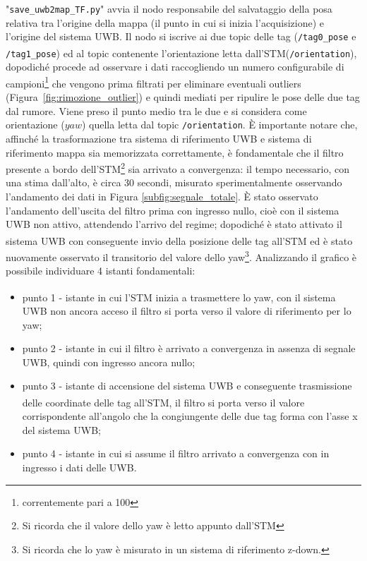 "\verb!save_uwb2map_TF.py!" avvia il nodo responsabile del salvataggio della posa relativa tra l'origine della mappa (il punto in cui si inizia l'acquisizione) e l'origine del sistema UWB. Il nodo si iscrive ai due topic delle tag (\verb!/tag0_pose! e \verb!/tag1_pose!) ed al topic contenente l'orientazione letta dall'STM\textsuperscript\textregistered\hspace{1mm}(\verb!/orientation!), dopodiché procede ad osservare i dati raccogliendo un numero configurabile di campioni\footnote{correntemente pari a 100} che vengono prima filtrati per eliminare eventuali outliers (Figura~\ref{fig:rimozione_outlier}) e quindi mediati per ripulire le pose delle due tag dal rumore. Viene preso il punto medio tra le due e si considera come orientazione ($yaw$) quella letta dal topic \verb!/orientation!.
È importante notare che, affinché la trasformazione tra sistema di riferimento UWB e sistema di riferimento mappa sia memorizzata correttamente, è fondamentale che il filtro presente a bordo dell'STM\footnote{Si ricorda che il valore dello yaw è letto appunto dall'STM} sia arrivato a convergenza: il tempo necessario, con una stima dall'alto, è circa 30 secondi, misurato sperimentalmente osservando l'andamento dei dati in Figura \ref{subfig:segnale_totale}. È stato osservato l'andamento dell'uscita del filtro prima con ingresso nullo, cioè con il sistema UWB non attivo, attendendo l'arrivo del regime; dopodiché è stato attivato il sistema UWB con conseguente invio della posizione delle tag all'STM\textsuperscript\textregistered\hspace{1mm} ed è stato nuovamente osservato il transitorio del valore dello yaw\footnote{Si ricorda che lo yaw è misurato in un sistema di riferimento z-down.}. Analizzando il grafico è possibile individuare 4 istanti fondamentali:
\begin{itemize}
    \item punto 1 - istante in cui l'STM\textsuperscript\textregistered\hspace{1mm} inizia a trasmettere lo yaw, con il sistema UWB non ancora acceso il filtro si porta verso il valore di riferimento per lo yaw;\\
    \item punto 2 - istante in cui il filtro è arrivato a convergenza in assenza di segnale UWB, quindi con ingresso ancora nullo;\\
    \item punto 3 - istante di accensione del sistema UWB e conseguente trasmissione delle coordinate delle tag all'STM\textsuperscript\textregistered\hspace{1mm}, il filtro si porta verso il valore corrispondente all'angolo che la congiungente delle due tag forma con l'asse x del sistema UWB;\\
    \item punto 4 - istante in cui si assume il filtro arrivato a convergenza con in ingresso i dati delle UWB.\\
\end{itemize}


